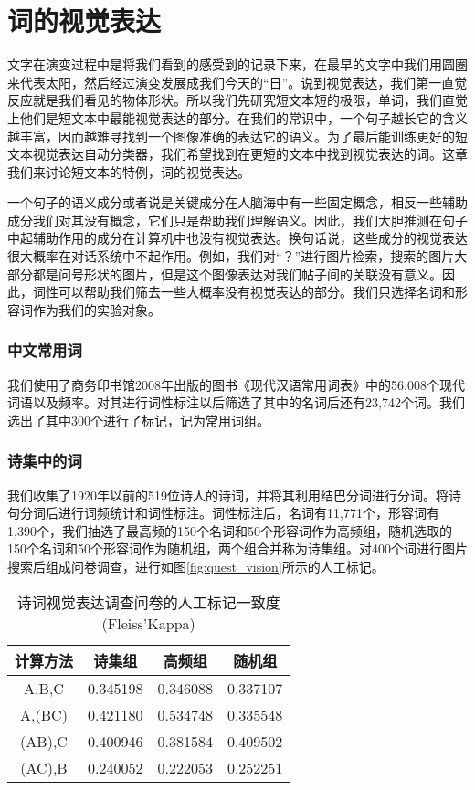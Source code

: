 \chapter{词的视觉表达}

文字在演变过程中是将我们看到的感受到的记录下来，在最早的文字中我们用圆圈来代表太阳，然后经过演变发展成我们今天的“日”。说到视觉表达，我们第一直觉反应就是我们看见的物体形状。所以我们先研究短文本短的极限，单词，我们直觉上他们是短文本中最能视觉表达的部分。在我们的常识中，一个句子越长它的含义越丰富，因而越难寻找到一个图像准确的表达它的语义。为了最后能训练更好的短文本视觉表达自动分类器，我们希望找到在更短的文本中找到视觉表达的词。这章我们来讨论短文本的特例，词的视觉表达。

一个句子的语义成分或者说是关键成分在人脑海中有一些固定概念，相反一些辅助成分我们对其没有概念，它们只是帮助我们理解语义。因此，我们大胆推测在句子中起辅助作用的成分在计算机中也没有视觉表达。换句话说，这些成分的视觉表达很大概率在对话系统中不起作用。例如，我们对“？”进行图片检索，搜索的图片大部分都是问号形状的图片，但是这个图像表达对我们帖子间的关联没有意义。因此，词性可以帮助我们筛去一些大概率没有视觉表达的部分。我们只选择名词和形容词作为我们的实验对象。

\subsection{中文常用词}
我们使用了商务印书馆2008年出版的图书《现代汉语常用词表》中的56,008个现代词语以及频率。对其进行词性标注以后筛选了其中的名词后还有23,742个词。我们选出了其中300个进行了标记，记为常用词组。

\subsection{诗集中的词}
我们收集了1920年以前的519位诗人的诗词，并将其利用结巴分词进行分词。将诗句分词后进行词频统计和词性标注。词性标注后，名词有11,771个，形容词有1,390个，我们抽选了最高频的150个名词和50个形容词作为高频组，随机选取的150个名词和50个形容词作为随机组，两个组合并称为诗集组。对400个词进行图片搜索后组成问卷调查，进行如图\ref{fig:quest_vision}所示的人工标记。

\begin{table}[htbp]
\centering
\caption{诗词视觉表达调查问卷的人工标记一致度(Fleiss'Kappa)} \label{tab:poem_label_kappa}
\begin{tabular}{|c|c|c|c|}
    \hline
		计算方法 & 诗集组 &  高频组 &  随机组  \\
	\hline
		A,B,C 	&  0.345198 &  0.346088 &  0.337107 \\
	\hline
		A,(BC)  &  0.421180 & 	0.534748 & 0.335548 \\
	\hline
		(AB),C  &  0.400946 & 0.381584 &  0.409502	\\
	\hline
		(AC),B  &  0.240052 & 0.222053 & 0.252251	\\
 	\hline
\end{tabular}
\end{table}

